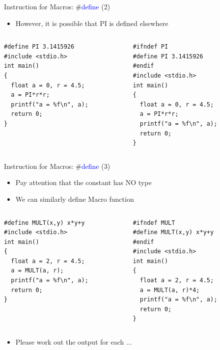 \begin{frame}[fragile]{Instruction for Macros: \#\textcolor{blue}{define} (2)}
\begin{itemize}
	\item {However, it is possible that PI is defined elsewhere}
\end{itemize}

\begin{columns}
\begin{column}{0.44\linewidth}
\begin{lstlisting}
#define PI 3.1415926
#include <stdio.h>
int main()
{
  float a = 0, r = 4.5;
  a = PI*r*r;
  printf("a = %f\n", a);
  return 0;
}
\end{lstlisting}
\end{column}
\begin{column}{0.44\linewidth}
\begin{lstlisting}
#ifndef PI
#define PI 3.1415926
#endif
#include <stdio.h>
int main()
{
  float a = 0, r = 4.5;
  a = PI*r*r;
  printf("a = %f\n", a);
  return 0;
}
\end{lstlisting}
\end{column}
\end{columns}
\end{frame}

\begin{frame}[fragile]{Instruction for Macros: \#\textcolor{blue}{define} (3)}
\begin{itemize}
	\item {Pay attention that the constant has NO type}
	\item {We can similarly define Macro function}
\end{itemize}
\begin{columns}
\begin{column}{0.40\linewidth}
\begin{lstlisting}
#define MULT(x,y) x*y+y
#include <stdio.h>
int main()
{
  float a = 2, r = 4.5;
  a = MULT(a, r);
  printf("a = %f\n", a);
  return 0;
}
\end{lstlisting}
\end{column}
\begin{column}{0.40\linewidth}
\begin{lstlisting}
#ifndef MULT
#define MULT(x,y) x*y+y
#endif
#include <stdio.h>
int main()
{
  float a = 2, r = 4.5;
  a = MULT(a, r)*4;
  printf("a = %f\n", a);
  return 0;
}
\end{lstlisting}
\end{column}
\end{columns}
\begin{itemize}
	\item {Please work out the output for each ...}
\end{itemize}
\end{frame}

